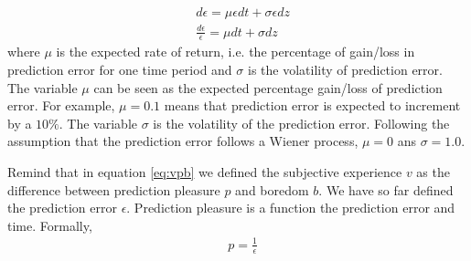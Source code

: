 \documentclass[11pt, onecolumn]{article}
\begin{document}
\begin{equation}
\begin{split}
& d \epsilon= \mu \epsilon dt + \sigma \epsilon dz \\
& \frac{d \epsilon}{\epsilon}= \mu dt + \sigma dz
\end{split}
\label{eq:wiener}
\end{equation}
where $\mu$ is the expected rate of return, i.e. the percentage of gain/loss in prediction error for one time period and $\sigma$ is the volatility of prediction error.
The variable $\mu$ can be seen as the expected percentage gain/loss of prediction error. For example, $\mu = 0.1$ means that prediction error is expected to increment by a $10\%$. The variable $\sigma$ is the volatility of the prediction error. Following the assumption that the prediction error follows a Wiener process,
$\mu = 0$ ans $\sigma= 1.0$.


Remind that in equation \ref{eq:vpb} we defined the subjective experience $v$ as the difference between prediction pleasure $p$ and boredom $b$. We have so far defined the prediction error $\epsilon$. Prediction pleasure is a function the prediction error and time. Formally, 
\begin{equation}
\begin{split}
& p = \frac{1}{\epsilon} \\
\end{split}
\label{eq:pinve}
\end{equation}
\end{document}
